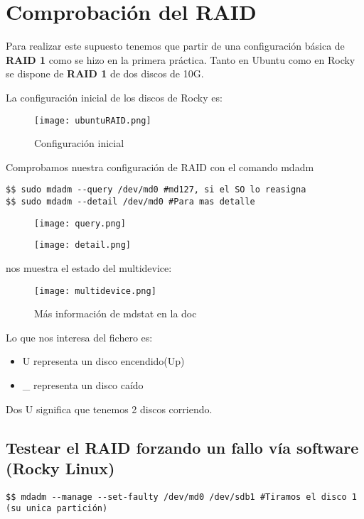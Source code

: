 \section{Comprobación del RAID}
Para realizar este supuesto tenemos que partir de una configuración básica de \textbf{RAID 1} como se hizo en la primera práctica. Tanto en Ubuntu como en Rocky se dispone de \textbf{RAID 1} de dos discos de 10G.

La configuración inicial de los discos de Rocky es:
\begin{figure}[H]
	\centering
	\texttt{[image: ubuntuRAID.png]}
	\caption{Configuración inicial}
\end{figure}

Comprobamos nuestra configuración de RAID con el comando mdadm \cite{mdadm}
\begin{verbatim}
$$ sudo mdadm --query /dev/md0 #md127, si el SO lo reasigna
$$ sudo mdadm --detail /dev/md0 #Para mas detalle
\end{verbatim}
\begin{figure}[H]
	\centering
	\texttt{[image: query.png]}
\end{figure}

\begin{figure}[H]
	\centering
	\texttt{[image: detail.png]}
\end{figure}

 nos muestra el estado del multidevice:

\begin{figure}[H]
	\centering
	\texttt{[image: multidevice.png]}
	\caption{Más información de mdstat en la doc\cite{mdstat}}
\end{figure}

Lo que nos interesa del fichero es:
\begin{itemize}
	\item U representa un disco encendido(Up) 
	\item \_ representa un disco caído
\end{itemize}
Dos U significa que tenemos 2 discos corriendo.

\subsection{Testear el RAID forzando un fallo vía software (Rocky Linux)}
\begin{verbatim}
$$ mdadm --manage --set-faulty /dev/md0 /dev/sdb1 #Tiramos el disco 1 (su unica partición)
\end{verbatim}

